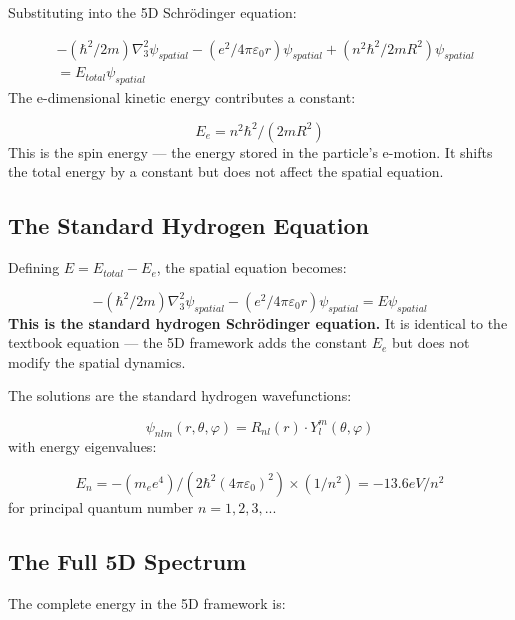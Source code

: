 \documentclass[aps,prd,preprint,superscriptaddress,longbibliography,floatfix]{revtex4-2}
\theoremstyle{remark}
\begin{document}
Substituting into the 5D Schr\"{o}dinger equation:


\begin{align}
    & -(\hbar^{2}/2m)\nabla^{2}_{3} \psi_{spatial} - (e^{2}/4\pi\varepsilon_{0}r) \psi_{spatial} + (n^{2}\hbar^{2}/2mR^{2}) \psi_{spatial} \\
    & = E_{total} \psi_{spatial}
\end{align}
The e-dimensional kinetic energy contributes a constant:


\begin{equation}
    E_e = n^{2}\hbar^{2}/(2mR^{2})
\end{equation}
This is the spin energy --- the energy stored in the particle's e-motion. It shifts the total energy by a constant but does not affect the spatial equation.


\subsection{The Standard Hydrogen Equation}

Defining $E = E_{total} - E_e$, the spatial equation becomes:


\begin{equation}
    -(\hbar^{2}/2m)\nabla^{2}_{3} \psi_{spatial} - (e^{2}/4\pi\varepsilon_{0}r) \psi_{spatial} = E \psi_{spatial}
\end{equation}
\textbf{This is the standard hydrogen Schr\"{o}dinger equation.} It is identical to the textbook equation --- the 5D framework adds the constant $E_e$ but does not modify the spatial dynamics.

The solutions are the standard hydrogen wavefunctions:


\begin{equation}
    \psi_{nlm}(r, \theta, \varphi) = R_{nl}(r) \cdot Y_l^m(\theta, \varphi)
\end{equation}
with energy eigenvalues:


\begin{equation}
    E_n = -(m_e e^{4})/(2\hbar^{2}(4\pi\varepsilon_{0})^{2}) \times (1/n^{2}) = -13.6 eV / n^{2}
\end{equation}
for principal quantum number $n = 1, 2, 3, ...$


\subsection{The Full 5D Spectrum}

The complete energy in the 5D framework is:
\end{document}
